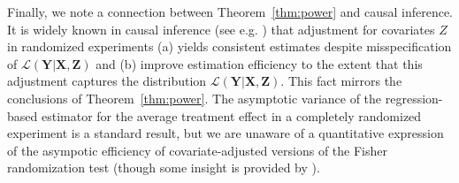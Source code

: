 \documentclass[12pt]{article}
\theoremstyle{definition}
\theoremstyle{remark}
\newcommand{\prx}{\bm X}
\newcommand{\srx}{X}
\newcommand{\prz}{\bm Z}
\newcommand{\srz}{Z}
\newcommand{\pry}{{\bm Y}}
\newcommand{\sry}{Y}
\begin{document}
Finally, we note a connection between Theorem~\ref{thm:power} and causal inference. It is widely known in causal inference (see e.g. \cite[Section 7.5]{Imbens2015}) that adjustment for covariates $\srz$ in randomized experiments (a) yields consistent estimates despite misspecification of $\mathcal L(\pry|\prx,\prz)$ and (b) improve estimation efficiency to the extent that this adjustment captures the distribution $\mathcal L(\pry|\prx,\prz)$. This fact mirrors the conclusions of Theorem~\ref{thm:power}. The asymptotic variance of the regression-based estimator for the average treatment effect in a completely randomized experiment is a standard result, but we are unaware of a quantitative expression of the asympotic efficiency of covariate-adjusted versions of the Fisher randomization test (though some insight is provided by \cite{Zhao2021}). 





\end{document}
